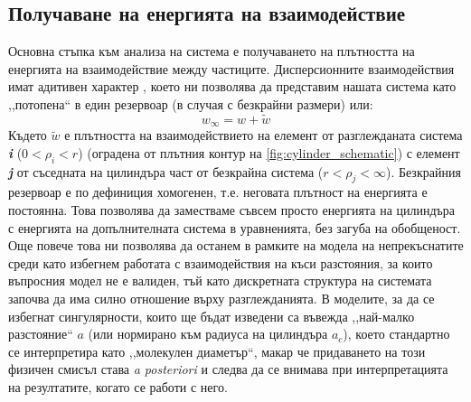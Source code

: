 \subsection{Получаване на енергията на взаимодействие}
Основна стъпка към анализа на система е получаването на плътността на енергията на взаимодействие между частиците. 
Дисперсионните взаимодействия имат адитивен характер \cite{israelachvili}, което ни позволява да представим нашата система като
,,потопена`` в един резервоар (в случая с безкрайни размери) или:
\begin{equation}
    w_{\infty}  = w + \tilde{w}
\end{equation}
Където $\tilde{w}$ е плътността на взаимодействието на елемент от разглежданата система \textbf{\textit{i}} ($0 < \rho_{i} < r$) (оградена от плътния контур на \autoref{fig:cylinder_schematic}) с елемент \textbf{\textit{j}} от съседната на цилиндъра част от безкрайна система ($r < \rho_{j} <  \infty$).
Безкрайния резервоар е по дефиниция хомогенен, т.е. неговата плътност на енергията е постоянна. Това позволява да заместваме съвсем просто енергията на цилиндъра с енергията на допълнителната система в уравненията, без загуба на обобщеност.
Още повече това ни позволява да останем в рамките на модела на непрекъснатите среди като избегнем работата с взаимодействия на къси разстояния, за които въпросния модел не е валиден, тъй като дискретната структура на системата започва да има силно отношение върху разглежданията.
В моделите, за да се избегнат сингулярности, които ще бъдат изведени са въвежда ,,най-малко разстояние`` $a$ (или нормирано към радиуса на цилиндъра $a_{c}$),
което стандартно се интерпретира като ,,молекулен диаметър``, макар че придаването на този физичен смисъл става \textit{a posteriori} \cite{israelachvili} и следва да се внимава 
при интерпретацията на резултатите, когато се работи с него.